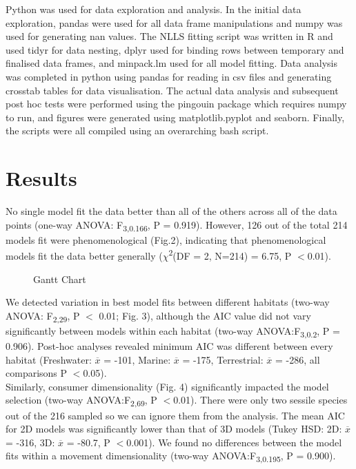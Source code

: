 \documentclass[11pt]{article}
\begin{document}
	Python was used for data exploration and analysis. In the initial data exploration, pandas were used for all data frame manipulations and numpy was used for generating nan values. The NLLS fitting script was written in R and used tidyr for data nesting, dplyr used for binding rows between temporary and finalised data frames, and minpack.lm used for all model fitting. Data analysis was completed in python using pandas for reading in csv files and generating crosstab tables for data visualisation. The actual data analysis and subsequent post hoc tests were performed using the pingouin package which requires numpy to run, and figures were generated using matplotlib.pyplot and seaborn. Finally, the scripts were all compiled using an overarching bash script. 
	
	
	\section*{Results}
	No single model fit the data better than all of the others across all of the data points (one-way ANOVA: F\textsubscript{3,0.166}, P = 0.919). However, 126 out of the total 214 models fit were phenomenological (Fig.2), indicating that phenomenological models fit the data better generally ($\chi$\textsuperscript{2}(DF = 2, N=214) = 6.75, P $<$0.01).\\
	
	\mbox{}
	\vfill
	
	\begin{figure}[h!]
		
	
	\caption{	Gantt Chart}
		
	\end{figure} 
	\newpage
	
	We detected variation in best model fits between different habitats (two-way ANOVA: F\textsubscript{2,29}, P $<$ 0.01; Fig. 3), although the AIC value did not vary significantly between models within each habitat (two-way ANOVA:F\textsubscript{3,0.2}, P = 0.906). Post-hoc analyses revealed minimum AIC was different between every habitat (Freshwater: $\overline{x}$ = -101, Marine: $\overline{x}$ = -175, Terrestrial: $\overline{x}$ = -286, all comparisons P $<$0.05). \\
	
	Similarly, consumer dimensionality (Fig. 4) significantly impacted the model selection (two-way ANOVA:F\textsubscript{2,69}, P $<$0.01). There were only two sessile species out of the 216 sampled so we can ignore them from the analysis. The mean AIC for 2D models was significantly lower than that of 3D models (Tukey HSD: 2D: $\overline{x}$ = -316, 3D: $\overline{x}$ = -80.7, P $<$0.001). We found no differences between the model fits within a movement dimensionality (two-way ANOVA:F\textsubscript{3,0.195}, P = 0.900).
		
\end{document}
